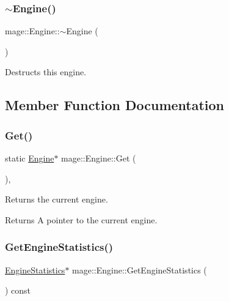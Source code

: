 \subsubsection{\texorpdfstring{$\sim$\+Engine()}{~Engine()}}
{\footnotesize\ttfamily mage\+::\+Engine\+::$\sim$\+Engine (\begin{DoxyParamCaption}{ }\end{DoxyParamCaption})\hspace{0.3cm}{\ttfamily [virtual]}}

Destructs this engine. 

\subsection{Member Function Documentation}
\hypertarget{classmage_1_1_engine_a146c8898afd978b4d1f0528128a43bbf}{}\label{classmage_1_1_engine_a146c8898afd978b4d1f0528128a43bbf} 
\subsubsection{\texorpdfstring{Get()}{Get()}}
{\footnotesize\ttfamily static \hyperlink{classmage_1_1_engine}{Engine}$\ast$ mage\+::\+Engine\+::\+Get (\begin{DoxyParamCaption}{ }\end{DoxyParamCaption})\hspace{0.3cm}{\ttfamily [static]}, {\ttfamily [noexcept]}}

Returns the current engine.

\begin{DoxyReturn}{Returns}
A pointer to the current engine. 
\end{DoxyReturn}
\hypertarget{classmage_1_1_engine_aacbd029d5e8f00e0acdb0f4d7cc04236}{}\label{classmage_1_1_engine_aacbd029d5e8f00e0acdb0f4d7cc04236} 
\subsubsection{\texorpdfstring{Get\+Engine\+Statistics()}{GetEngineStatistics()}}
{\footnotesize\ttfamily \hyperlink{structmage_1_1_engine_statistics}{Engine\+Statistics}$\ast$ mage\+::\+Engine\+::\+Get\+Engine\+Statistics (\begin{DoxyParamCaption}{ }\end{DoxyParamCaption}) const\hspace{0.3cm}{\ttfamily [noexcept]}}


